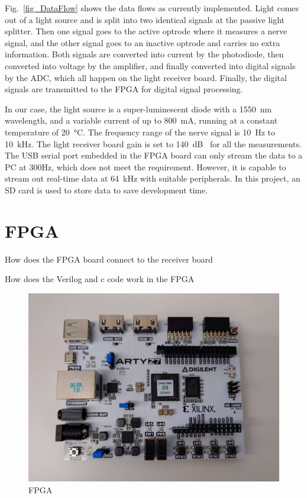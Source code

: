 Fig.~\ref{fig_DataFlow} shows the data flows as currently implemented.  Light comes out of a light source and is split into two identical signals at the passive light splitter.  Then one signal goes to the active optrode where it measures a nerve signal, and the other signal goes to an inactive optrode and carries no extra information.  Both signals are converted into current by the photodiode, then converted into voltage by the amplifier, and finally converted into digital signals by the ADC, which all happen on the light receiver board.  Finally, the digital signals are transmitted to the FPGA for digital signal processing.

In our case, the light source is a super-luminescent diode with a \qty{1550}{\nm} wavelength, and a variable current of up to \qty{800}{\mA}, running at a constant temperature of \qty{20}{\degreeCelsius}.  The frequency range of the nerve signal is \qty{10}{\Hz} to \qty{10}{\kHz}.  The light receiver board gain is set to \qty{140}{dB\Omega} for all the measurements.  The USB serial port embedded in the FPGA board can only stream the data to a PC at 300Hz, which does not meet the requirement.  However, it is capable to stream out real-time data at \qty{64}{kHz} with suitable peripherals.  In this project, an SD card is used to store data to save development time.

\section{FPGA}

How does the FPGA board connect to the receiver board

How does the Verilog and c code work in the FPGA

\begin{figure}[!ht]
\centering
\includegraphics[width=0.9\linewidth]{4-ANC_Sys/FPGA.jpg}
\caption{FPGA}
\label{fig_FPGA}
\end{figure}

